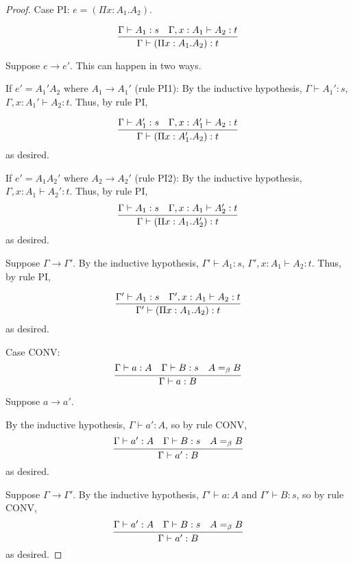 \documentclass{article}
\begin{document}
\begin{proof}
    Case PI: $e=(\Pi x:A_1.A_2)$.
  
  \[\infer{\Gamma\vdash(\Pi x:A_1.A_2):t}{\Gamma\vdash A_1:s & \Gamma,x:A_1\vdash A_2:t}\]

  Suppose $e\rightarrow e'$. This can happen in two ways.

  If $e'=A_1' A_2$ where $A_1\rightarrow A_1'$ (rule PI1): By the inductive hypothesis, $\Gamma\vdash A_1':s$, $\Gamma,x:A_1'\vdash A_2:t$. Thus, by rule PI,

  \[\infer{\Gamma\vdash(\Pi x:A_1'.A_2):t}{\Gamma\vdash A_1':s & \Gamma,x:A_1'\vdash A_2:t}\]
  as desired.

  If $e'=A_1 A_2'$ where $A_2\rightarrow A_2'$ (rule PI2): By the inductive hypothesis,  $\Gamma,x:A_1\vdash A_2':t$. Thus, by rule PI,
  \[\infer{\Gamma\vdash(\Pi x:A_1.A_2'):t}{\Gamma\vdash A_1:s & \Gamma,x:A_1\vdash A_2':t}\]
  as desired.

  Suppose $\Gamma\rightarrow\Gamma'$. By the inductive hypothesis, $\Gamma'\vdash A_1:s$, $\Gamma',x:A_1\vdash A_2:t$. Thus, by rule PI,

  \[\infer{\Gamma'\vdash(\Pi x:A_1.A_2):t}{\Gamma'\vdash A_1:s & \Gamma',x:A_1\vdash A_2:t}\]
  as desired.

  Case CONV:
  \[\infer{\Gamma\vdash a:B}{\Gamma\vdash a:A & \Gamma\vdash B:s & A=_\beta B}\]

  Suppose $a\rightarrow a'$.
  
  By the inductive hypothesis, $\Gamma\vdash a':A$, so by rule CONV,
  \[\infer{\Gamma\vdash a':B}{\Gamma\vdash a':A & \Gamma\vdash B:s & A=_\beta B}\]
  as desired.
  
  Suppose $\Gamma\rightarrow\Gamma'$.
  By the inductive hypothesis, $\Gamma'\vdash a:A$ and $\Gamma'\vdash B:s$, so by rule CONV,
  \[\infer{\Gamma\vdash a':B}{\Gamma\vdash a':A & \Gamma\vdash B:s & A=_\beta B}\]
  as desired.
\end{proof}


{}

\end{document}
